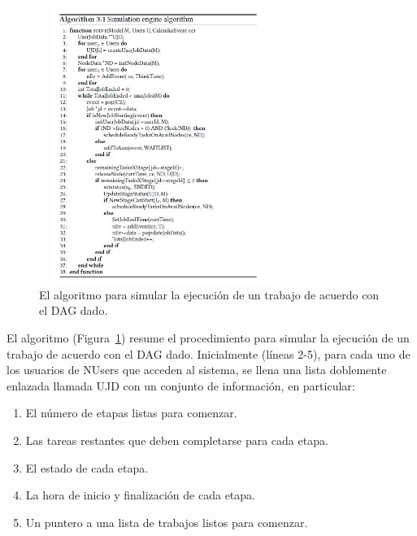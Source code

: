 \documentclass[10pt,journal]{IEEEtran}
\begin{document}
\begin{figure}[H]
 \begin{center}
       \includegraphics[width=8cm, height=9cm]{figuras/5.JPG}
      \caption{El algoritmo para simular la ejecución de un trabajo de acuerdo con el DAG dado.}
      \label{f5} 
      \end{center}
\end{figure}

El algoritmo (Figura~\ref{f5}) resume el procedimiento para simular la ejecución de un trabajo de acuerdo con el DAG dado. Inicialmente (líneas 2-5), para cada uno de los usuarios de NUsers que acceden al sistema, se llena una lista doblemente enlazada llamada UJD con un conjunto de información, en particular:
\begin{enumerate}
    \item El número de etapas listas para comenzar.
    \item Las tareas restantes que deben completarse para cada etapa.
    \item El estado de cada etapa.
    \item La hora de inicio y finalización de cada etapa.
    \item Un puntero a una lista de trabajos listos para comenzar.
\end{enumerate}

\end{document}

